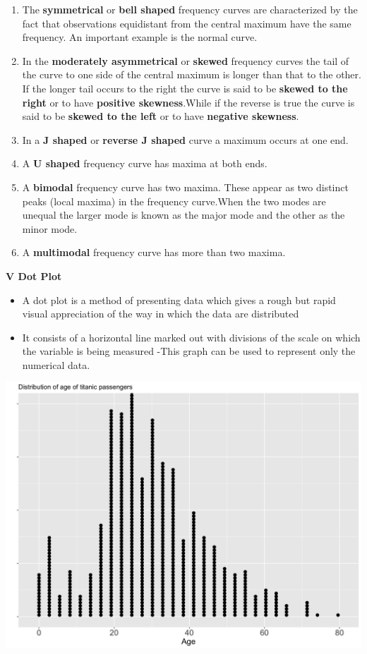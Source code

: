\documentclass[]{book}
\providecommand{\tightlist}{%
  \setlength{\itemsep}{0pt}\setlength{\parskip}{0pt}}
\begin{document}
\begin{enumerate}
\def\labelenumi{\arabic{enumi}.}
\tightlist
\item
  The \textbf{symmetrical} or \textbf{bell shaped} frequency curves are characterized by the fact that observations equidistant from the central maximum have the same frequency. An important example is the normal curve.
\item
  In the \textbf{moderately asymmetrical} or \textbf{skewed} frequency curves the tail of the curve to one side of the central maximum is longer than that to the other. If the longer tail occurs to the right the curve is said to be \textbf{skewed to the right} or to have \textbf{positive skewness}.While if the reverse is true the curve is said to be \textbf{skewed to the left} or to have \textbf{negative skewness}.
\item
  In a \textbf{J shaped} or \textbf{reverse J shaped} curve a maximum occurs at one end.
\item
  A \textbf{U shaped} frequency curve has maxima at both ends.
\item
  A \textbf{bimodal} frequency curve has two maxima. These appear as two distinct peaks (local maxima) in the frequency curve.When the two modes are unequal the larger mode is known as the major mode and the other as the minor mode.
\item
  A \textbf{multimodal} frequency curve has more than two maxima.
\end{enumerate}

\textbf{V Dot Plot}

\begin{itemize}
\tightlist
\item
  A dot plot is a method of presenting data which gives a rough but rapid visual appreciation of the way in which the data are distributed
\item
  It consists of a horizontal line marked out with divisions of the scale on which the variable is being measured
  -This graph can be used to represent only the numerical data.
\end{itemize}

\begin{center}\includegraphics[width=0.8\linewidth]{figure/dotplot-1} \end{center}
\end{document}
